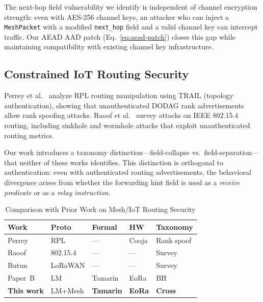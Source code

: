 \documentclass[journal]{IEEEtran}
\begin{document}
The next-hop field vulnerability we identify is independent of channel
encryption strength: even with AES-256 channel keys, an attacker who can
inject a \texttt{MeshPacket} with a modified \texttt{next\_hop} field and a
valid channel key can intercept traffic. Our AEAD AAD patch (Eq.~\ref{eq:aead-patch})
closes this gap while maintaining compatibility with existing channel key
infrastructure.

\subsection{Constrained IoT Routing Security}

Perrey et al.~\cite{perrey2016} analyze RPL routing manipulation using
TRAIL (topology authentication), showing that unauthenticated DODAG rank
advertisements allow rank spoofing attacks. Raoof et al.~\cite{raoof2019}
survey attacks on IEEE 802.15.4 routing, including sinkhole and wormhole
attacks that exploit unauthenticated routing metrics.

Our work introduces a taxonomy distinction---field-collapse vs.\
field-separation---that neither of these works identifies. This distinction
is orthogonal to authentication: even with authenticated routing advertisements,
the behavioral divergence arises from whether the forwarding hint field is
used as a \emph{receive predicate} or as a \emph{relay instruction}.

\begin{table}[h]
  \centering
  \caption{Comparison with Prior Work on Mesh/IoT Routing Security}
  \label{tab:related}
  \begin{tabular}{p{1.7cm}p{1.4cm}p{1.1cm}p{1.1cm}p{1.4cm}}
    \toprule
    Work & Proto & Formal & HW & Taxonomy \\
    \midrule
    Perrey~\cite{perrey2016} & RPL & --- & Cooja & Rank spoof \\
    Raoof~\cite{raoof2019} & 802.15.4 & --- & --- & Survey \\
    Butun~\cite{butun2019} & LoRaWAN & --- & --- & Survey \\
    Paper~B~\cite{paperb} & LM & Tamarin & EoRa & BH \\
    \textbf{This work} & LM+Mesh & \textbf{Tamarin} & \textbf{EoRa} & \textbf{Cross} \\
    \bottomrule
  \end{tabular}
\end{table}

\end{document}
